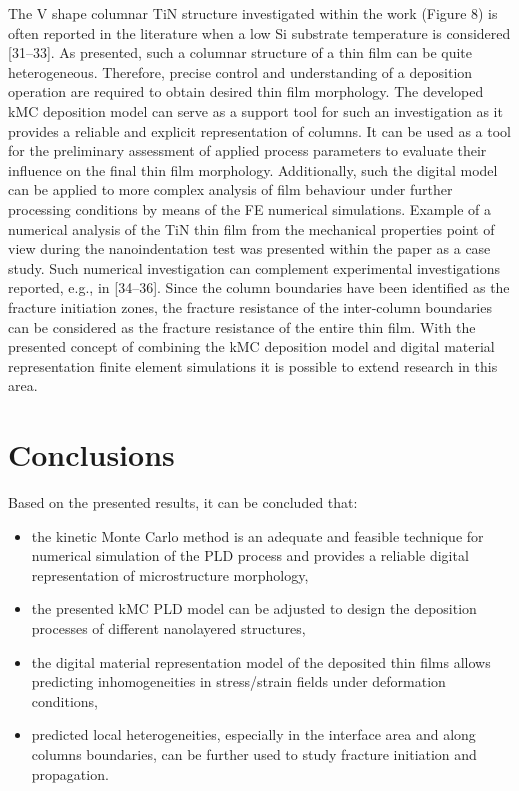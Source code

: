 \documentclass[journal,article,submit,pdftex,moreauthors]{Definitions/mdpi}
\begin{document}
The V shape columnar TiN structure investigated within the work (Figure 8) is often reported in the literature when a low Si substrate temperature is considered [31–33]. As presented, such a columnar structure of a thin film can be quite heterogeneous. Therefore, precise control and understanding of a deposition operation are required to obtain desired thin film morphology. The developed kMC deposition model can serve as a support tool for such an investigation as it provides a reliable and explicit representation of columns. It can be used as a tool for the preliminary assessment of applied process parameters to evaluate their influence on the final thin film morphology. Additionally, such the digital model can be applied to more complex analysis of film behaviour under further processing conditions by means of the FE numerical simulations. Example of a numerical analysis of the TiN thin film from the mechanical properties point of view during the nanoindentation test was presented within the paper as a case study. Such numerical investigation can complement experimental investigations reported, e.g., in [34–36]. Since the column boundaries have been identified as the fracture initiation zones, the fracture resistance of the inter-column boundaries can be considered as the fracture resistance of the entire thin film. With the presented concept of combining the kMC deposition model and digital material representation finite element simulations it is possible to extend research in this area.
 
\section{Conclusions}
 
\noindent Based on the presented results, it can be concluded that:
\begin{itemize}
\item	the kinetic Monte Carlo method is an adequate and feasible technique for numerical simulation of the PLD process and provides a reliable digital representation of microstructure morphology,
\item	the presented kMC PLD model can be adjusted to design the deposition processes of different nanolayered structures,
\item	the digital material representation model of the deposited thin films allows predicting inhomogeneities in stress/strain fields under deformation conditions,
\item   predicted local heterogeneities, especially in the interface area and along columns boundaries, can be further used to study fracture initiation and propagation. 
\end{itemize}
 
\end{document}

